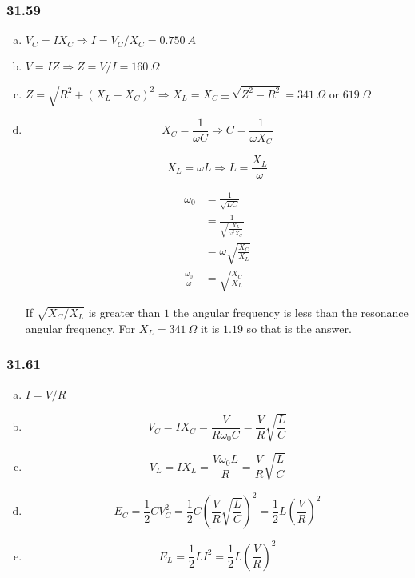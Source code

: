 \documentclass{article}
\begin{document}
\subsubsection{31.59}

\begin{enumerate}[(a)]
  \item $V_C = I X_C \Rightarrow I = V_C / X_C = \qty{0.750}{A}$

  \item $V = I Z \Rightarrow Z = V / I = \qty{160}{\Omega}$

  \item $Z = \sqrt{R^2 + (X_L - X_C)^2} \Rightarrow X_L = X_C \pm \sqrt{Z^2 - R^2} = \qty{341}{\Omega} \text{ or } \qty{619}{\Omega}$

  \item

        \[X_C = \frac{1}{\omega C} \Rightarrow C = \frac{1}{\omega X_C}\]

        \[X_L = \omega L \Rightarrow L = \frac{X_L}{\omega}\]

        \begin{align*}
          \omega_0                & = \frac{1}{\sqrt{L C}}                      \\
                                  & = \frac{1}{\sqrt{\frac{X_L}{\omega^2 X_C}}} \\
                                  & = \omega \sqrt{\frac{X_C}{X_L}}             \\
          \frac{\omega_0}{\omega} & = \sqrt{\frac{X_C}{X_L}}
        \end{align*}

        If $\sqrt{X_C / X_L}$ is greater than $1$ the angular frequency is less than the resonance angular frequency. For $X_L = \qty{341}{\Omega}$ it is $1.19$ so that is the answer.
\end{enumerate}

\subsubsection{31.61}

\begin{enumerate}[(a)]
  \item $I = V / R$

  \item \[V_C = I X_C = \frac{V}{R \omega_0 C} = \frac{V}{R} \sqrt{\frac{L}{C}}\]

  \item \[V_L = I X_L = \frac{V \omega_0 L}{R} = \frac{V}{R} \sqrt{\frac{L}{C}}\]

  \item \[E_C = \frac{1}{2} C V_C^2 = \frac{1}{2} C \left( \frac{V}{R} \sqrt{\frac{L}{C}} \right)^2 = \frac{1}{2} L \left( \frac{V}{R} \right)^2\]

  \item \[E_L = \frac{1}{2} L I^2 = \frac{1}{2} L \left( \frac{V}{R} \right)^2\]
\end{enumerate}
\end{document}
